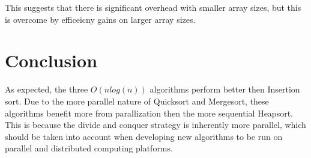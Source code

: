 \documentclass[conference]{IEEEtran}
\begin{document}
This suggests that there is significant overhead with smaller array sizes, but this is overcome by efficeicny gains on larger array sizes. 
\section{Conclusion}
As expected, the three $O(n log(n))$ algorithms perform better then Insertion sort. 
Due to the more parallel nature of Quicksort and Mergesort, these algorithms benefit more from parallization then the more sequential Heapsort. 
This is because the divide and conquer strategy is inherently more parallel, which should be taken into account when developing new algorithms to be run on parallel and distributed computing platforms. 


\appendix
\end{document}
